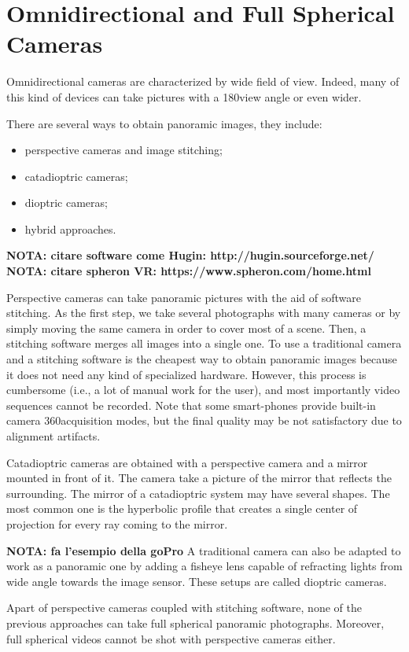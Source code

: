 \section{Omnidirectional and Full Spherical Cameras}
\label{sec:cameraclassification}
Omnidirectional cameras are characterized by wide field of view. Indeed, many of this kind of devices can take pictures with a 180\degree view angle or even wider.

There are several ways to obtain panoramic images, they include:
\begin{itemize}
	\item perspective cameras and image stitching;
	\item catadioptric cameras;
	\item dioptric cameras;
	\item hybrid approaches.
\end{itemize}

\textbf{NOTA: citare software come Hugin: http://hugin.sourceforge.net/}
\textbf{NOTA: citare spheron VR: https://www.spheron.com/home.html}

Perspective cameras can take panoramic pictures with the aid of software stitching. As the first step, we take several photographs with many cameras or by simply moving the same camera in order to cover most of a scene. Then, a stitching software merges all images into a single one. To use a traditional camera and a stitching software is the cheapest way to obtain panoramic images because it does not need any kind of specialized hardware. However, this process is cumbersome (i.e., a lot of manual work for the user), and most importantly video sequences cannot be recorded. Note that some smart-phones provide built-in camera 360\degree acquisition modes, but the final quality may be not satisfactory due to alignment artifacts.

Catadioptric cameras are obtained with a perspective camera and a mirror mounted in front of it. The camera take a picture of the mirror that reflects the surrounding. The mirror of a catadioptric system may have several shapes. The most common one is the hyperbolic profile that creates a single center of 
projection for every ray coming to the mirror.

\textbf{NOTA: fa l'esempio della goPro}
A traditional camera can also be adapted to work as a panoramic one by adding a fisheye lens capable of refracting lights from wide angle towards the image sensor. These setups are called dioptric cameras.

Apart of perspective cameras coupled with stitching software, none of the previous approaches can take full spherical panoramic photographs. Moreover, full spherical videos cannot be shot with perspective cameras either.

